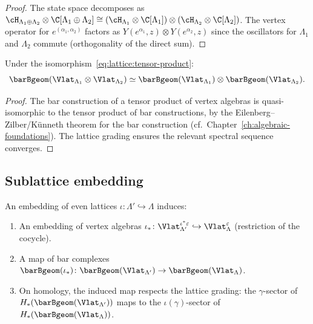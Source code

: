 \begin{proof}
The state space decomposes as
$\cH_{\Lambda_1 \oplus \Lambda_2} \otimes \C[\Lambda_1 \oplus \Lambda_2]
\cong (\cH_{\Lambda_1} \otimes \C[\Lambda_1]) \otimes
(\cH_{\Lambda_2} \otimes \C[\Lambda_2])$.
The vertex operator for $e^{(\alpha_1,\alpha_2)}$ factors as
$Y(e^{\alpha_1}, z) \otimes Y(e^{\alpha_2}, z)$
since the oscillators for $\Lambda_1$ and $\Lambda_2$ commute
(orthogonality of the direct sum).
\end{proof}

\begin{corollary}\label{cor:lattice:kunneth}
Under the isomorphism~\eqref{eq:lattice:tensor-product}:
\[
\barBgeom(\Vlat_{\Lambda_1} \otimes \Vlat_{\Lambda_2})
\simeq
\barBgeom(\Vlat_{\Lambda_1})
\otimes \barBgeom(\Vlat_{\Lambda_2}).
\]
\end{corollary}

\begin{proof}
The bar construction of a tensor product of vertex algebras is
quasi-isomorphic to the tensor product of bar constructions, by
the Eilenberg--Zilber/K\"unneth theorem for the bar construction
(cf.\ Chapter~\ref{ch:algebraic-foundations}). The lattice grading
ensures the relevant spectral sequence converges.
\end{proof}

\subsection{Sublattice embedding}

\begin{proposition}\label{prop:lattice:sublattice}
An embedding of even lattices $\iota \colon \Lambda' \hookrightarrow \Lambda$
induces:
\begin{enumerate}[label=(\roman*)]
\item An embedding of vertex algebras
 $\iota_* \colon \Vlat_{\Lambda'}^{\iota^*\varepsilon}
 \hookrightarrow \Vlat_\Lambda^\varepsilon$
 (restriction of the cocycle).
\item A map of bar complexes
 $\barBgeom(\iota_*) \colon
 \barBgeom(\Vlat_{\Lambda'}) \to \barBgeom(\Vlat_\Lambda)$.
\item On homology, the induced map respects the lattice grading:
 the $\gamma$-sector of $H_*(\barBgeom(\Vlat_{\Lambda'}))$ maps to
 the $\iota(\gamma)$-sector of $H_*(\barBgeom(\Vlat_\Lambda))$.
\end{enumerate}
\end{proposition}

